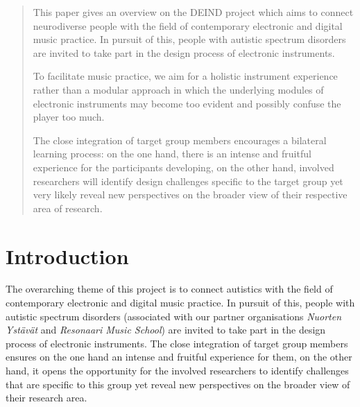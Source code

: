 \documentclass{acm_proc_article-sp}
\begin{document}
\maketitle
\begin{abstract}
	This paper gives an overview on the DEIND project which aims to connect neurodiverse people with the field of contemporary electronic and digital music practice. 
	In pursuit of this, people with autistic spectrum disorders are invited to take part in the design process of electronic instruments.

	To facilitate music practice, we aim for a holistic instrument experience rather than a modular approach in which the underlying modules of electronic instruments may become too evident and possibly confuse the player too much.

	The close integration of target group members encourages a bilateral learning process: on the one hand, there is an intense and fruitful experience for the participants developing, on the other hand, involved researchers will identify design challenges specific to the target group yet very likely reveal new perspectives on the broader view of their respective area of research.
\end{abstract}





\section{Introduction}


The overarching theme of this project is to connect autistics with the field of contemporary electronic and digital music practice. 
In pursuit of this, people with autistic spectrum disorders (associated with our partner organisations \emph{Nuorten Ystävät} and \emph{Resonaari Music School}) are invited to take part in the design process of electronic instruments. 
The close integration of target group members ensures on the one hand an intense and fruitful experience for them, on the other hand, it opens the opportunity for the involved researchers to identify challenges that are specific to this group yet reveal new perspectives on the broader view of their research area.
\end{document}
